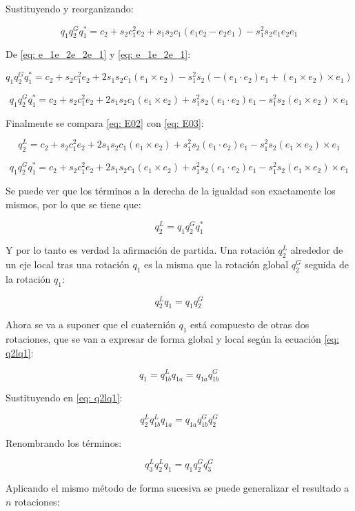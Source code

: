 \documentclass[12pt, a4paper]{report}
\begin{document}
Sustituyendo y reorganizando:

$$ q_1q_2^Gq_1^* = c_2 + s_2c_1^2e_2 + s_1s_2c_1(e_1e_2 - e_2e_1) - s_1^2s_2e_1e_2e_1 $$

De \eqref{eq: e_1e_2e_2e_1} y \eqref{eq: e_1e_2e_1}:

$$ q_1q_2^Gq_1^* = c_2 + s_2c_1^2e_2 + 2s_1s_2c_1(e_1 \times e_2) - s_1^2s_2(-(e_1 \cdot e_2)e_1 + (e_1 \times e_2) \times e_1) $$

\begin{equation} \label{eq: E03}
q_1q_2^Gq_1^* = c_2 + s_2c_1^2e_2 + 2s_1s_2c_1(e_1 \times e_2) + s_1^2s_2(e_1 \cdot e_2)e_1 - s_1^2s_2(e_1 \times e_2) \times e_1
\end{equation}

Finalmente se compara \eqref{eq: E02} con \eqref{eq: E03}:

$$ q_2^L = c_2 + s_2c_1^2e_2 + 2s_1s_2c_1(e_1 \times e_2) + s_1^2s_2(e_1 \cdot e_2)e_1 - s_1^2s_2(e_1 \times e_2) \times e_1 $$

$$ q_1q_2^Gq_1^* = c_2 + s_2c_1^2e_2 + 2s_1s_2c_1(e_1 \times e_2) + s_1^2s_2(e_1 \cdot e_2)e_1 - s_1^2s_2(e_1 \times e_2) \times e_1 $$

Se puede ver que los términos a la derecha de la igualdad son exactamente los mismos, por lo que se tiene que:

\begin{equation} \label{eq: q2I}
q_2^L = q_1q_2^Gq_1^*
\end{equation}

Y por lo tanto es verdad la afirmación de partida. Una rotación $q_2^L$ alrededor de un eje local tras una rotación $q_1$ es la misma que la rotación global $q_2^G$ seguida de la rotación $q_1$:

\begin{equation} \label{eq: q2lq1}
q_2^Lq_1 = q_1q_2^G
\end{equation}

Ahora se va a suponer que el cuaternión $q_1$ está compuesto de otras dos rotaciones, que se van a expresar de forma global y local según la ecuación \eqref{eq: q2lq1}:

$$ q_1 = q_{1b}^Lq_{1a} = q_{1a}q_{1b}^G $$

Sustituyendo en \eqref{eq: q2lq1}:

$$ q_2^Lq_{1b}^Lq_{1a} = q_{1a}q_{1b}^Gq_2^G $$

Renombrando los términos:

$$ q_3^Lq_{2}^Lq_{1} = q_{1}q_{2}^Gq_3^G $$

Aplicando el mismo método de forma sucesiva se puede generalizar el resultado a $n$ rotaciones:
\end{document}
